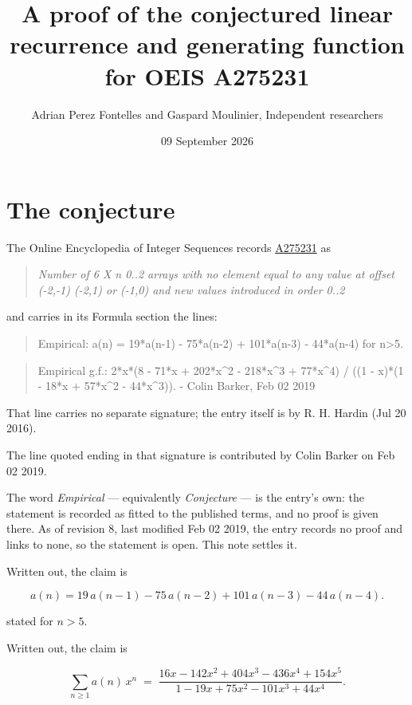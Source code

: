\documentclass[11pt]{article}
\title{A proof of the conjectured linear recurrence and generating function for OEIS A275231}
\author{Adrian Perez Fontelles and Gaspard Moulinier, Independent researchers}
\date{09 September 2026}
\theoremstyle{definition}
\begin{document}
\maketitle
\section{The conjecture}

The Online Encyclopedia of Integer Sequences records \href{https://oeis.org/A275231}{A275231} as

\begin{quote}\itshape Number of 6 X n 0..2 arrays with no element equal to any value at offset (-2,-1) (-2,1) or (-1,0) and new values introduced in order 0..2\end{quote}

and carries in its Formula section the lines:

\begin{quote}\ttfamily Empirical: a(n) = 19*a(n-1) - 75*a(n-2) + 101*a(n-3) - 44*a(n-4) for n>5.\end{quote}

\begin{quote}\ttfamily Empirical g.f.: 2*x*(8 - 71*x + 202*x\textasciicircum{}2 - 218*x\textasciicircum{}3 + 77*x\textasciicircum{}4) / ((1 - x)*(1 - 18*x + 57*x\textasciicircum{}2 - 44*x\textasciicircum{}3)). - Colin Barker, Feb 02 2019\end{quote}

That line carries no separate signature; the entry itself is by R. H. Hardin (Jul 20 2016).

The line quoted ending in that signature is contributed by Colin Barker on Feb 02 2019.

The word {\itshape Empirical} --- equivalently {\itshape Conjecture} --- is the entry's own: the statement is recorded as fitted to the published terms, and no proof is given there. As of revision 8, last modified Feb 02 2019, the entry records no proof and links to none, so the statement is open. This note settles it.

Written out, the claim is

\[a(n) = 19\,a(n-1) - 75\,a(n-2) + 101\,a(n-3) - 44\,a(n-4).\]

stated for $n > 5$.

Written out, the claim is

\[\sum_{n \ge 1} a(n)\,x^n \;=\; \frac{16x - 142x^{2} + 404x^{3} - 436x^{4} + 154x^{5}}{1 - 19x + 75x^{2} - 101x^{3} + 44x^{4}}.\]
\end{document}

